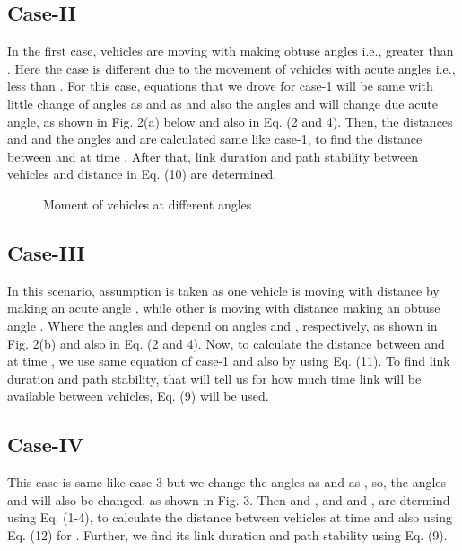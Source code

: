 \documentclass[journal]{IEEEtran}
\begin{document}
\subsection{Case-II}
In the first case, vehicles are moving with making obtuse angles i.e., greater than . Here the case is different due to the movement of vehicles with acute angles i.e., less than . For this case, equations that we drove for case-1 will be same with little change of angles  as  and  as  and also the angles  and  will change due acute angle, as shown in Fig. 2(a) below and also in Eq. (2 and 4). Then, the distances  and  and the angles  and  are calculated same like case-1, to find the distance  between  and  at time . After that, link duration and path stability between vehicles and distance  in Eq. (10) are determined.
\begin{figure}[h]
  \centering
 \caption{Moment of vehicles at different angles}
\end{figure}


\subsection{Case-III}
In this scenario, assumption is taken as one vehicle is moving with distance  by making an acute angle , while other is moving with distance  making an obtuse angle . Where the angles  and  depend on angles  and , respectively, as shown in Fig. 2(b) and also in Eq. (2 and 4). Now, to calculate the distance  between  and  at time , we use same equation of case-1 and also by using Eq. (11). To find link duration and path stability, that will tell us for how much time link will be available between vehicles, Eq. (9) will be used.



\subsection{Case-IV}
This case is same like case-3 but we change the angles  as  and  as , so, the angles  and  will also be changed, as shown in Fig. 3. Then  and , and  and , are dtermind using Eq. (1-4), to calculate the distance  between vehicles at time  and also using Eq. (12) for . Further, we find its link duration and path stability using Eq. (9).
\end{document}
